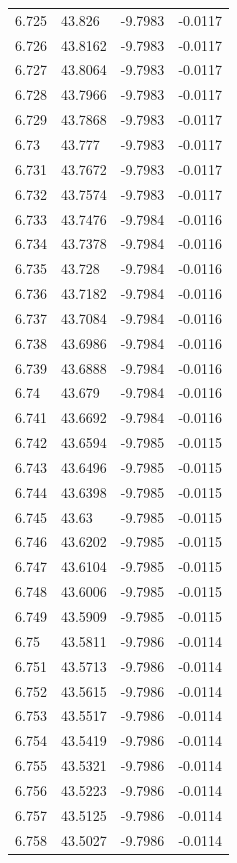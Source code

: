 \begin{tabular}{llll}
6.725 & 43.826 & -9.7983 & -0.0117 \\
6.726 & 43.8162 & -9.7983 & -0.0117 \\
6.727 & 43.8064 & -9.7983 & -0.0117 \\
6.728 & 43.7966 & -9.7983 & -0.0117 \\
6.729 & 43.7868 & -9.7983 & -0.0117 \\
6.73 & 43.777 & -9.7983 & -0.0117 \\
6.731 & 43.7672 & -9.7983 & -0.0117 \\
6.732 & 43.7574 & -9.7983 & -0.0117 \\
6.733 & 43.7476 & -9.7984 & -0.0116 \\
6.734 & 43.7378 & -9.7984 & -0.0116 \\
6.735 & 43.728 & -9.7984 & -0.0116 \\
6.736 & 43.7182 & -9.7984 & -0.0116 \\
6.737 & 43.7084 & -9.7984 & -0.0116 \\
6.738 & 43.6986 & -9.7984 & -0.0116 \\
6.739 & 43.6888 & -9.7984 & -0.0116 \\
6.74 & 43.679 & -9.7984 & -0.0116 \\
6.741 & 43.6692 & -9.7984 & -0.0116 \\
6.742 & 43.6594 & -9.7985 & -0.0115 \\
6.743 & 43.6496 & -9.7985 & -0.0115 \\
6.744 & 43.6398 & -9.7985 & -0.0115 \\
6.745 & 43.63 & -9.7985 & -0.0115 \\
6.746 & 43.6202 & -9.7985 & -0.0115 \\
6.747 & 43.6104 & -9.7985 & -0.0115 \\
6.748 & 43.6006 & -9.7985 & -0.0115 \\
6.749 & 43.5909 & -9.7985 & -0.0115 \\
6.75 & 43.5811 & -9.7986 & -0.0114 \\
6.751 & 43.5713 & -9.7986 & -0.0114 \\
6.752 & 43.5615 & -9.7986 & -0.0114 \\
6.753 & 43.5517 & -9.7986 & -0.0114 \\
6.754 & 43.5419 & -9.7986 & -0.0114 \\
6.755 & 43.5321 & -9.7986 & -0.0114 \\
6.756 & 43.5223 & -9.7986 & -0.0114 \\
6.757 & 43.5125 & -9.7986 & -0.0114 \\
6.758 & 43.5027 & -9.7986 & -0.0114 \\

\end{tabular}
